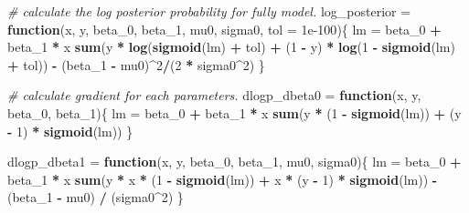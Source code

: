 \documentclass[
]{article}
\newenvironment{Shaded}{\begin{snugshade}}{\end{snugshade}}
\newcommand{\CommentTok}[1]{\textcolor[rgb]{0.56,0.35,0.01}{\textit{#1}}}
\newcommand{\ControlFlowTok}[1]{\textcolor[rgb]{0.13,0.29,0.53}{\textbf{#1}}}
\newcommand{\DataTypeTok}[1]{\textcolor[rgb]{0.13,0.29,0.53}{#1}}
\newcommand{\DecValTok}[1]{\textcolor[rgb]{0.00,0.00,0.81}{#1}}
\newcommand{\FloatTok}[1]{\textcolor[rgb]{0.00,0.00,0.81}{#1}}
\newcommand{\KeywordTok}[1]{\textcolor[rgb]{0.13,0.29,0.53}{\textbf{#1}}}
\newcommand{\NormalTok}[1]{#1}
\newcommand{\OperatorTok}[1]{\textcolor[rgb]{0.81,0.36,0.00}{\textbf{#1}}}
\newcommand{\StringTok}[1]{\textcolor[rgb]{0.31,0.60,0.02}{#1}}
\begin{document}
\begin{Shaded}
\begin{Highlighting}[]
\CommentTok{# calculate the log posterior probability for fully model.}
\NormalTok{log_posterior =}\StringTok{ }\ControlFlowTok{function}\NormalTok{(x, y, beta_}\DecValTok{0}\NormalTok{, beta_}\DecValTok{1}\NormalTok{, mu0, sigma0, }\DataTypeTok{tol =} \FloatTok{1e-100}\NormalTok{)\{}
\NormalTok{  lm =}\StringTok{ }\NormalTok{beta_}\DecValTok{0} \OperatorTok{+}\StringTok{ }\NormalTok{beta_}\DecValTok{1} \OperatorTok{*}\StringTok{ }\NormalTok{x}
  \KeywordTok{sum}\NormalTok{(y }\OperatorTok{*}\StringTok{ }\KeywordTok{log}\NormalTok{(}\KeywordTok{sigmoid}\NormalTok{(lm) }\OperatorTok{+}\StringTok{ }\NormalTok{tol) }\OperatorTok{+}\StringTok{ }\NormalTok{(}\DecValTok{1} \OperatorTok{-}\StringTok{ }\NormalTok{y) }\OperatorTok{*}\StringTok{ }\KeywordTok{log}\NormalTok{(}\DecValTok{1} \OperatorTok{-}\StringTok{ }\KeywordTok{sigmoid}\NormalTok{(lm) }\OperatorTok{+}\StringTok{ }\NormalTok{tol)) }\OperatorTok{-}\StringTok{ }\NormalTok{(beta_}\DecValTok{1} \OperatorTok{-}\StringTok{ }\NormalTok{mu0)}\OperatorTok{^}\DecValTok{2}\OperatorTok{/}\NormalTok{(}\DecValTok{2} \OperatorTok{*}\StringTok{ }\NormalTok{sigma0}\OperatorTok{^}\DecValTok{2}\NormalTok{)}
\NormalTok{\}}

\CommentTok{# calculate gradient for each parameters.}
\NormalTok{dlogp_dbeta0 =}\StringTok{ }\ControlFlowTok{function}\NormalTok{(x, y, beta_}\DecValTok{0}\NormalTok{, beta_}\DecValTok{1}\NormalTok{)\{}
\NormalTok{  lm =}\StringTok{ }\NormalTok{beta_}\DecValTok{0} \OperatorTok{+}\StringTok{ }\NormalTok{beta_}\DecValTok{1} \OperatorTok{*}\StringTok{ }\NormalTok{x}
  \KeywordTok{sum}\NormalTok{(y }\OperatorTok{*}\StringTok{ }\NormalTok{(}\DecValTok{1} \OperatorTok{-}\StringTok{ }\KeywordTok{sigmoid}\NormalTok{(lm)) }\OperatorTok{+}\StringTok{ }\NormalTok{(y }\OperatorTok{-}\StringTok{ }\DecValTok{1}\NormalTok{) }\OperatorTok{*}\StringTok{ }\KeywordTok{sigmoid}\NormalTok{(lm))}
\NormalTok{\}}

\NormalTok{dlogp_dbeta1 =}\StringTok{ }\ControlFlowTok{function}\NormalTok{(x, y, beta_}\DecValTok{0}\NormalTok{, beta_}\DecValTok{1}\NormalTok{, mu0, sigma0)\{}
\NormalTok{  lm =}\StringTok{ }\NormalTok{beta_}\DecValTok{0} \OperatorTok{+}\StringTok{ }\NormalTok{beta_}\DecValTok{1} \OperatorTok{*}\StringTok{ }\NormalTok{x}
  \KeywordTok{sum}\NormalTok{(y }\OperatorTok{*}\StringTok{ }\NormalTok{x }\OperatorTok{*}\StringTok{ }\NormalTok{(}\DecValTok{1} \OperatorTok{-}\StringTok{ }\KeywordTok{sigmoid}\NormalTok{(lm)) }\OperatorTok{+}\StringTok{ }\NormalTok{x }\OperatorTok{*}\StringTok{ }\NormalTok{(y }\OperatorTok{-}\StringTok{ }\DecValTok{1}\NormalTok{) }\OperatorTok{*}\StringTok{ }\KeywordTok{sigmoid}\NormalTok{(lm)) }\OperatorTok{-}\StringTok{ }\NormalTok{(beta_}\DecValTok{1} \OperatorTok{-}\StringTok{ }\NormalTok{mu0) }\OperatorTok{/}\StringTok{ }\NormalTok{(sigma0}\OperatorTok{^}\DecValTok{2}\NormalTok{)}
\NormalTok{\}}


\end{Highlighting}
\end{Shaded}
\end{document}
